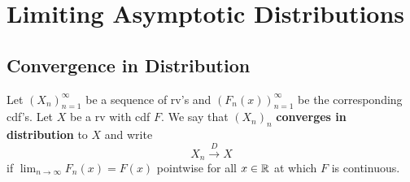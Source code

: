 \documentclass[11pt,fleqn]{book} %
\begin{document}
\chapter{Limiting Asymptotic Distributions}


\section{Convergence in Distribution}

\begin{definition} \label{def:411}
Let \((X_n)_{n=1}^\infty\) be a sequence of rv's and \((F_n(x))_{n=1}^\infty\) be the corresponding cdf's. Let \(X\) be a rv with cdf \(F\). We say that \((X_n)_n\) \textbf{converges in distribution} to \(X\) and write
\[
X_n\xrightarrow{D} X
\]
if \(\lim_{n\rightarrow\infty}F_n(x) = F(x)\) pointwise for all \(x \in \mathbb{R}\) at which \(F\) is continuous.
\end{definition}
\end{document}
